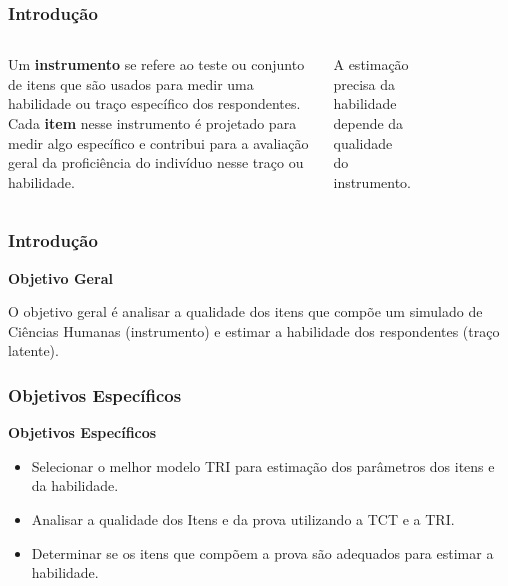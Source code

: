 \documentclass{beamer}
\begin{document}
\begin{frame}
	
	\frametitle{Introdução}
	\begin{columns}
		
		
		Um \textbf{instrumento} se refere ao teste ou conjunto de itens que são usados para medir uma habilidade ou traço específico dos respondentes. Cada \textbf{item} nesse instrumento é projetado para medir algo específico e contribui para a avaliação geral da proficiência do indivíduo nesse traço ou habilidade. \newline
		
		A estimação precisa da habilidade depende da qualidade do instrumento.
		
		
		\begin{figure}
		\end{figure}	
		
	\end{columns}
	
\end{frame}


	
\begin{frame}
		\frametitle{Introdução}
		\begin{center}
		\textbf{Objetivo Geral}	
		\end{center}
		
			O objetivo geral é analisar a qualidade dos itens que compõe um simulado de Ciências Humanas (instrumento) e estimar a habilidade dos respondentes (traço latente).
			

	\end{frame}
	\begin{frame}
		\frametitle{Objetivos Específicos}
		\begin{center}
			\textbf{Objetivos Específicos}	
		\end{center}
		
		\begin{itemize}
			\item<1-> Selecionar o melhor modelo TRI para estimação dos parâmetros dos itens e da habilidade.
			\item<2-> Analisar a qualidade dos Itens e da prova utilizando a TCT e a TRI. 
			\item<3-> Determinar se os itens que compõem a prova são adequados para estimar a habilidade.
		\end{itemize}
	\end{frame}
	
\end{document}
